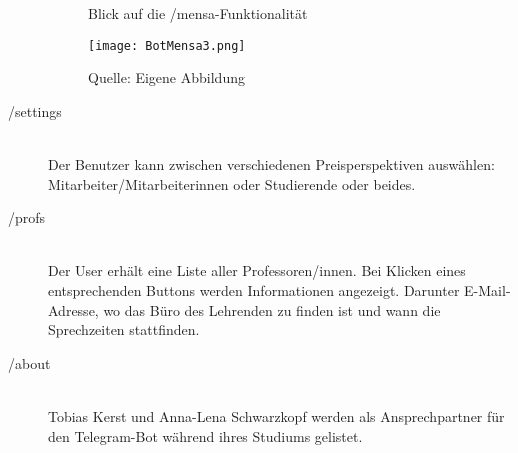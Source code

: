 \begin{description}
  \begin{figure}[!htb]
      \centering
      \caption{Blick auf die /mensa-Funktionalität}
        \texttt{[image: BotMensa3.png]}
      \caption*{Quelle: Eigene Abbildung}
  \end{figure}
  \item[/settings] \hfill \\
  Der Benutzer kann zwischen verschiedenen Preisperspektiven auswählen: Mitarbeiter/Mitarbeiterinnen oder Studierende oder beides.
  \item[/profs] \hfill \\
  Der User erhält eine Liste aller Professoren/innen. Bei Klicken eines entsprechenden Buttons werden Informationen angezeigt. Darunter E-Mail-Adresse, wo das Büro des Lehrenden zu finden ist und wann die Sprechzeiten stattfinden.
  \item[/about] \hfill \\
  Tobias Kerst und Anna-Lena Schwarzkopf werden als Ansprechpartner für den Telegram-Bot während ihres Studiums gelistet.
\end{description}
